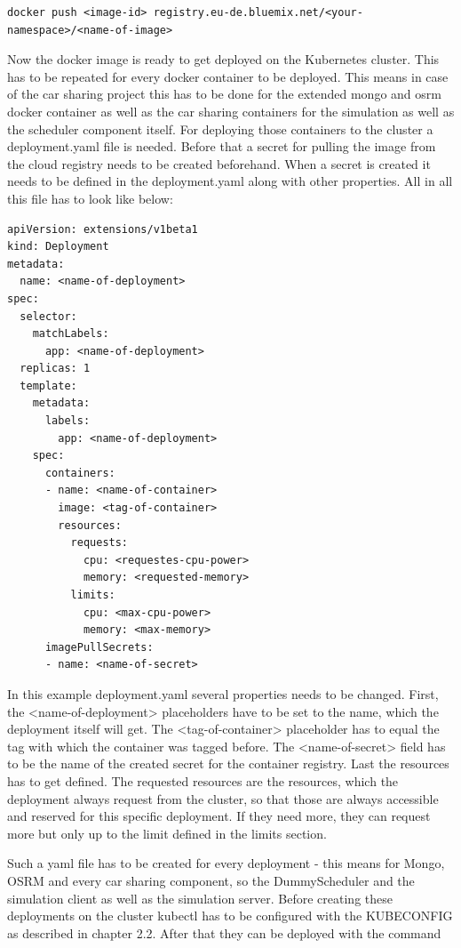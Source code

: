 \begin{lstlisting}
docker push <image-id> registry.eu-de.bluemix.net/<your-namespace>/<name-of-image>
\end{lstlisting}

Now the docker image is ready to get deployed on the Kubernetes cluster. This has to be repeated for every docker container to be deployed. This means in case of the car sharing project this has to be done for the extended mongo and osrm docker container as well as the car sharing containers for the simulation as well as the scheduler component itself. For deploying those containers to the cluster a deployment.yaml file is needed. Before that a secret for pulling the image from the cloud registry needs to be created beforehand. When a secret is created it needs to be defined in the deployment.yaml along with other properties. All in all this file has to look like below:

\begin{lstlisting}
apiVersion: extensions/v1beta1
kind: Deployment
metadata:
  name: <name-of-deployment>
spec:
  selector:
    matchLabels:
      app: <name-of-deployment>
  replicas: 1
  template:
    metadata:
      labels:
        app: <name-of-deployment>
    spec:
      containers:
      - name: <name-of-container>
        image: <tag-of-container>
        resources:
          requests:
            cpu: <requestes-cpu-power>
            memory: <requested-memory>
          limits:
            cpu: <max-cpu-power>
            memory: <max-memory>
      imagePullSecrets:
      - name: <name-of-secret>
\end{lstlisting}

In this example deployment.yaml several properties needs to be changed. First, the <name-of-deployment> placeholders have to be set to the name, which the deployment itself will get. The <tag-of-container> placeholder has to equal the tag with which the container was tagged before. The <name-of-secret> field has to be the name of the created secret for the container registry. Last the resources has to get defined. The requested resources are the resources, which the deployment always request from the cluster, so that those are always accessible and reserved for this specific deployment. If they need more, they can request more but only up to the limit defined in the limits section.

Such a yaml file has to be created for every deployment - this means for Mongo, OSRM and every car sharing component, so the DummyScheduler and the simulation client as well as the simulation server. Before creating these deployments on the cluster kubectl has to be configured with the KUBECONFIG as described in chapter 2.2. After that they can be deployed with the command

